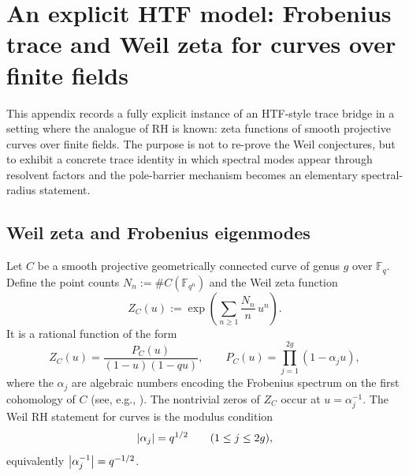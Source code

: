 \section{An explicit HTF model: Frobenius trace and Weil zeta for curves over finite fields}
\label{app:htf_function_field}

This appendix records a fully explicit instance of an HTF-style trace bridge in a setting where the analogue of RH is known: zeta functions of smooth projective curves over finite fields.
The purpose is not to re-prove the Weil conjectures, but to exhibit a concrete trace identity in which spectral modes appear through resolvent factors and the pole-barrier mechanism becomes an elementary spectral-radius statement.

\subsection{Weil zeta and Frobenius eigenmodes}
Let $C$ be a smooth projective geometrically connected curve of genus $g$ over $\mathbb{F}_q$.
Define the point counts $N_n:=\#C(\mathbb{F}_{q^n})$ and the Weil zeta function
\[
Z_C(u):=\exp\!\left(\sum_{n\ge 1} \frac{N_n}{n}\,u^n\right).
\]
It is a rational function of the form
\begin{equation}
\label{eq:weil_zeta_rational}
Z_C(u)=\frac{P_C(u)}{(1-u)(1-qu)},
\qquad
P_C(u)=\prod_{j=1}^{2g}\left(1-\alpha_j u\right),
\end{equation}
where the $\alpha_j$ are algebraic numbers encoding the Frobenius spectrum on the first cohomology of $C$ (see, e.g., \cite{Rosen2002}).
The nontrivial zeros of $Z_C$ occur at $u=\alpha_j^{-1}$.
The Weil RH statement for curves is the modulus condition
\[
\left\lvert \alpha_j\right\rvert=q^{1/2}\qquad (1\le j\le 2g),
\]
equivalently $\left\lvert \alpha_j^{-1}\right\rvert=q^{-1/2}$.

